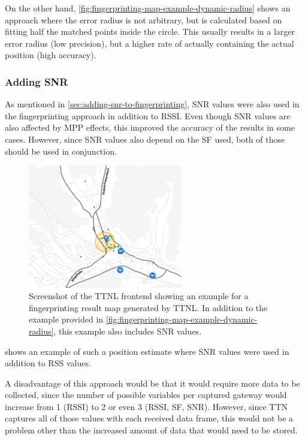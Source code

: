 On the other hand, \cref{fig:fingerprinting-map-example-dynamic-radius} shows an approach where the error radius is not arbitrary, but is calculated based on fitting half the matched points inside the circle.
This usually results in a larger error radius (low precision), but a higher rate of actually containing the actual position (high accuracy).

\subsubsection{Adding \acl{SNR}}


As mentioned in \cref{sec:adding-snr-to-fingerprinting}, \ac{SNR} values were also used in the fingerprinting approach in addition to \ac{RSSI}.
Even though \ac{SNR} values are also affected by \ac{MPP} effects, this improved the accuracy of the results in some cases.
However, since \ac{SNR} values also depend on the \ac{SF} used, both of those should be used in conjunction.

\begin{figure}[htbp]
    \centering
    \includegraphics[width=0.6\textwidth]{pictures/ttn-locator/frontend/fingerprinting/fingerprinting_map_example_with_snr.png}
    \caption{
        Screenshot of the \ac{TTNL} frontend showing an example for a fingerprinting result map generated by \ac{TTNL}.
        In addition to the example provided in \cref{fig:fingerprinting-map-example-dynamic-radius}, this example also includes \ac{SNR} values.
    }\label{fig:fingerprinting-map-example-with-snr}
\end{figure}

 shows an example of such a position estimate where \ac{SNR} values were used in addition to \ac{RSS} values.

A disadvantage of this approach would be that it would require more data to be collected, since the number of possible variables per captured gateway would increase from 1 (\ac{RSSI}) to 2 or even 3 (\ac{RSSI}, \ac{SF}, \ac{SNR}).
However, since \ac{TTN} captures all of those values with each received data frame, this would not be a problem other than the increased amount of data that would need to be stored.

